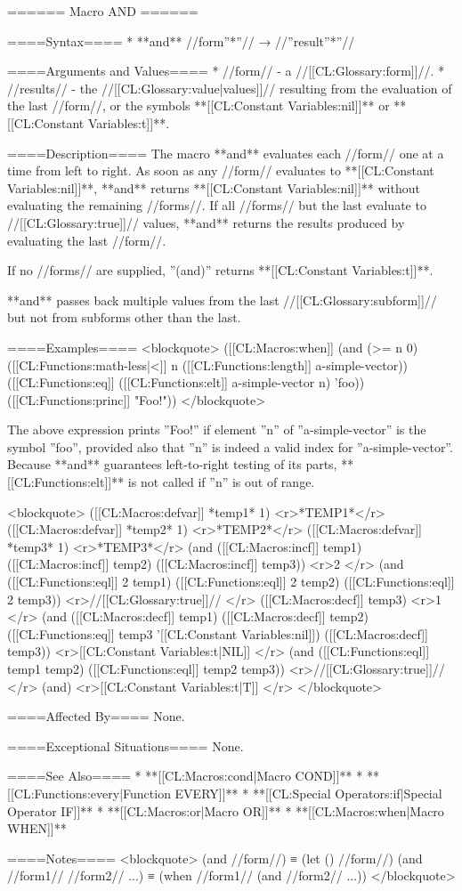 ====== Macro AND ======

====Syntax====
  * **and** //form''*''// → //''result''*''//

====Arguments and Values====
  * //form// - a //[[CL:Glossary:form]]//.
  * //results// - the //[[CL:Glossary:value|values]]// resulting from the evaluation of the last //form//, or the symbols **[[CL:Constant Variables:nil]]** or **[[CL:Constant Variables:t]]**.

====Description====
The macro **and** evaluates each //form// one at a time from left to right. As soon as any //form// evaluates to **[[CL:Constant Variables:nil]]**, **and** returns **[[CL:Constant Variables:nil]]** without evaluating the remaining //forms//. If all //forms// but the last evaluate to //[[CL:Glossary:true]]// values, **and** returns the results produced by evaluating the last //form//.

If no //forms// are supplied, ''(and)'' returns **[[CL:Constant Variables:t]]**.

**and** passes back multiple values from the last //[[CL:Glossary:subform]]// but not from subforms other than the last.

====Examples====
<blockquote>
([[CL:Macros:when]] (and (>= n 0) 
           ([[CL:Functions:math-less|<]] n ([[CL:Functions:length]] a-simple-vector))
           ([[CL:Functions:eq]] ([[CL:Functions:elt]] a-simple-vector n) 'foo))
      ([[CL:Functions:princ]] "Foo!"))
</blockquote>

The above expression prints ''Foo!'' if element ''n'' of ''a-simple-vector'' is the symbol ''foo'', provided also that ''n'' is indeed a valid index for ''a-simple-vector''. Because **and** guarantees left-to-right testing of its parts, **[[CL:Functions:elt]]** is not called if ''n'' is out of range.

<blockquote>
([[CL:Macros:defvar]] *temp1* 1) <r>*TEMP1*</r>
([[CL:Macros:defvar]] *temp2* 1) <r>*TEMP2*</r>
([[CL:Macros:defvar]] *temp3* 1) <r>*TEMP3*</r>
(and ([[CL:Macros:incf]] temp1) ([[CL:Macros:incf]] temp2) ([[CL:Macros:incf]] temp3)) <r>2 </r>
(and ([[CL:Functions:eql]] 2 temp1) ([[CL:Functions:eql]] 2 temp2) ([[CL:Functions:eql]] 2 temp3)) <r>//[[CL:Glossary:true]]// </r>
([[CL:Macros:decf]] temp3) <r>1 </r>
(and ([[CL:Macros:decf]] temp1) ([[CL:Macros:decf]] temp2) ([[CL:Functions:eq]] temp3 '[[CL:Constant Variables:nil]]) ([[CL:Macros:decf]] temp3)) <r>[[CL:Constant Variables:t|NIL]] </r>
(and ([[CL:Functions:eql]] temp1 temp2) ([[CL:Functions:eql]] temp2 temp3)) <r>//[[CL:Glossary:true]]// </r>
(and) <r>[[CL:Constant Variables:t|T]] </r>
</blockquote>

====Affected By====
None.

====Exceptional Situations====
None.

====See Also====
  * **[[CL:Macros:cond|Macro COND]]**
  * **[[CL:Functions:every|Function EVERY]]**
  * **[[CL:Special Operators:if|Special Operator IF]]**
  * **[[CL:Macros:or|Macro OR]]**
  * **[[CL:Macros:when|Macro WHEN]]**

====Notes====
<blockquote>
(and //form//) ≡ (let () //form//)
(and //form1// //form2// ...) ≡ (when //form1// (and //form2// ...))
</blockquote>

